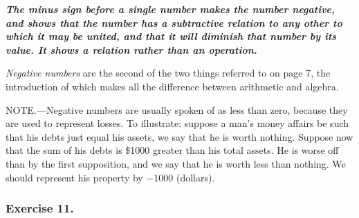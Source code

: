 \documentclass{book}
\begin{document}
\textbf{\textit{ The minus sign before a single number makes the
number negative, and shows that the number has a subtractive
relation to any other to which it may be united, and that it will
diminish that number by its value. It shows a relation rather than
an operation.}}

\textit{Negative numbers} are the second of the two things
referred to on page 7, the introduction of which makes all the
difference between arithmetic and algebra.

NOTE.---Negative numbers are usually spoken of as less than zero,
because they are used to represent losses. To illustrate: suppose
a man's money affairs be such that his debts just equal his
assets, we say that he is worth nothing. Suppose now that the sum
of his debts is \$1000 greater than his total assets. He is worse
off than by the first supposition, and we say that he is worth
less than nothing. We should represent his property by $-1000$
(dollars).

\subsubsection{Exercise 11.}
\end{document}
